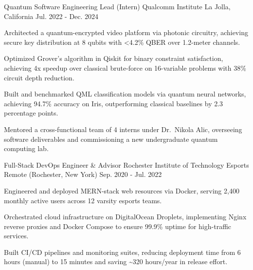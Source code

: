 

\begin{cventries}

  \cventry
    {Quantum Software Engineering Lead (Intern)} 
    {Qualcomm Institute} 
    {La Jolla, California} 
    {Jul. 2022 - Dec. 2024} 
    {
      \begin{cvitems}
        \item {Architected a quantum-encrypted video platform via photonic circuitry, achieving secure key distribution at 8 qubits with <4.2\% QBER over 1.2-meter channels.}
        \item {Optimized Grover's algorithm in Qiskit for binary constraint satisfaction, achieving 4x speedup over classical brute-force on 16-variable problems with 38\% circuit depth reduction.}
        \item {Built and benchmarked QML classification models via quantum neural networks, achieving 94.7\% accuracy on Iris, outperforming classical baselines by 2.3 percentage points.}
        \item {Mentored a cross-functional team of 4 interns under Dr.\ Nikola Alic, overseeing software deliverables and commissioning a new undergraduate quantum computing lab.}
      \end{cvitems}
    }
    
  \cventry
    {Full-Stack DevOps Engineer \& Advisor} 
    {Rochester Institute of Technology Esports} 
    {Remote (Rochester, New York)} 
    {Sep. 2020 - Jul. 2022} 
    {
      \begin{cvitems}
        \item {Engineered and deployed MERN-stack web resources via Docker, serving 2{,}400 monthly active users across 12 varsity esports teams.}
        \item{Orchestrated cloud infrastructure on DigitalOcean Droplets, implementing Nginx reverse proxies and Docker Compose to ensure 99.9\% uptime for high-traffic services.}
        \item{Built CI/CD pipelines and monitoring suites, reducing deployment time from 6 hours (manual) to 15 minutes and saving \textasciitilde320 hours/year in release effort.}
      \end{cvitems}
    }


\end{cventries}
